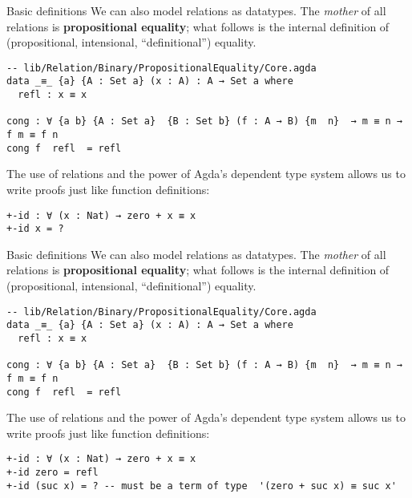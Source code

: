 \documentclass[t,aspectratio=169,9pt]{beamer}
\begin{document}
\begin{frame}[fragile]{Basic definitions}
  We can also model relations as datatypes. The {\it mother} of all relations is
  {\bf propositional equality}; what follows is the internal definition of
  (propositional, intensional, ``definitional'') equality.
\begin{verbatim}
-- lib/Relation/Binary/PropositionalEquality/Core.agda
data _≡_ {a} {A : Set a} (x : A) : A → Set a where
  refl : x ≡ x

cong : ∀ {a b} {A : Set a}  {B : Set b} (f : A → B) {m  n}  → m ≡ n → f m ≡ f n
cong f  refl  = refl
\end{verbatim}
The use of relations and the power of Agda's dependent type system allows us to
write proofs just like function definitions: 
\begin{verbatim}
+-id : ∀ (x : Nat) → zero + x ≡ x 
+-id x = ?
\end{verbatim}
\end{frame}

\begin{frame}[fragile]{Basic definitions}
  We can also model relations as datatypes. The {\it mother} of all relations is
  {\bf propositional equality}; what follows is the internal definition of
  (propositional, intensional, ``definitional'') equality.
\begin{verbatim}
-- lib/Relation/Binary/PropositionalEquality/Core.agda
data _≡_ {a} {A : Set a} (x : A) : A → Set a where
  refl : x ≡ x

cong : ∀ {a b} {A : Set a}  {B : Set b} (f : A → B) {m  n}  → m ≡ n → f m ≡ f n
cong f  refl  = refl
\end{verbatim}
The use of relations and the power of Agda's dependent type system allows us to
write proofs just like function definitions: 
\begin{verbatim}
+-id : ∀ (x : Nat) → zero + x ≡ x
+-id zero = refl
+-id (suc x) = ? -- must be a term of type  '(zero + suc x) ≡ suc x'
\end{verbatim}
\end{frame}
\end{document}
